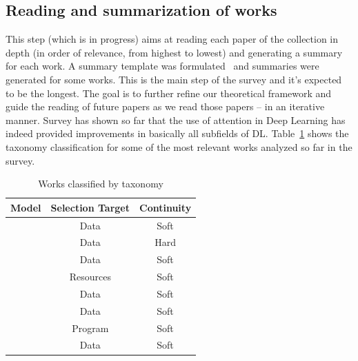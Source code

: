 \documentclass[12pt]{article}
\begin{document}
\subsection{Reading and summarization of works}
This step (which is in progress) aims at reading each paper of the collection in depth
(in order of relevance, from highest to lowest) and generating a summary for each work.
A summary template was formulated~\cite{ref:paper-anal-template} and summaries were generated for some works.
This is the main step of the survey and it's expected to be the longest.
The goal is to further refine our theoretical framework and guide the reading of future papers as we read those papers
-- in an iterative manner.
Survey has shown so far that the use of attention in Deep Learning has indeed provided improvements in basically all
subfields of DL.
Table~\ref{table:taxonomy} shows the taxonomy classification for some of the most relevant works analyzed so far in the survey.

\begin{table}[H]
\centering
\caption{\small Works classified by taxonomy}
\begin{tabular}{|c|c|c|}
	\hline
    \textbf{Model} & \textbf{Selection Target} & \textbf{Continuity}\\
    \hline
    \cite{ref:show-attend-tell} & Data & Soft\\
    \hline
    \cite{ref:rec-models} & Data & Hard\\
    \hline
    \cite{ref:one-shot} & Data & Soft\\
    \hline
    \cite{ref:act} & Resources & Soft\\
    \hline
    \cite{ref:ntm} & Data & Soft\\
    \hline
    \cite{ref:img-captioning} & Data & Soft\\
    \hline
    \cite{ref:np} & Program & Soft\\
    \hline
    \cite{ref:transformer} & Data & Soft\\
    \hline
\end{tabular}
\label{table:taxonomy}
\end{table}

\newpage
\printbibliography

%
%
\end{document}
